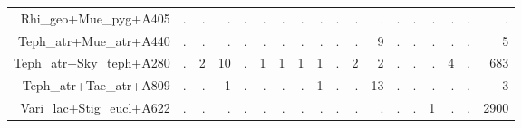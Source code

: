 \documentclass[a4paper, 11]{article}\usepackage[]{graphicx}\usepackage[]{color}
\begin{document}
\begin{table}
\begin{tabular}{rrrrrrrrrrrrrrrrrr}
  Rhi\_geo+Mue\_pyg+A405 & . & . & . & . & . & . & . & . & . & . & . & . & . & . & . & . & . \\ 
  Teph\_atr+Mue\_atr+A440 & . & . & . & . & . & . & . & . & . & . & 9 & . & . & . & . & . & 5 \\ 
  Teph\_atr+Sky\_teph+A280 & . & 2 & 10 & . & 1 & 1 & 1 & 1 & . & 2 & 2 & . & . & . & 4 & . & 683 \\ 
  Teph\_atr+Tae\_atr+A809 & . & . & 1 & . & . & . & . & 1 & . & . & 13 & . & . & . & . & . & 3 \\ 
  Vari\_lac+Stig\_eucl+A622 & . & . & . & . & . & . & . & . & . & . & . & . & . & 1 & . & . & 2900 \\ 
   \hline
\end{tabular}
\end{table}
\end{document}
